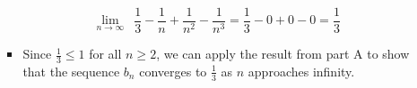 \documentclass[12pt]{report}
\begin{document}
\begin{enumerate}[leftmargin=\labelsep]
\begin{enumerate}
\begin{tcolorbox}
\begin{itemize}[label={}]
                            \begin{equation*}
                                {\lim_{n \to \infty}}\,\,\, \frac{1}{3} - \frac{1}{n} + \frac{1}{n^2} - \frac{1}{n^3} = \frac{1}{3} - 0 + 0 - 0 = \frac{1}{3}
                            \end{equation*}
                            \item Since $\frac{1}{3} \leq 1$ for all $n \geq 2$, we can apply the result from part A to show that the sequence $b_n$ converges to $\frac{1}{3}$ as $n$ approaches infinity.
                        \end{itemize}
                    \end{tcolorbox}
        \end{enumerate} 


\end{enumerate}
\end{document}
